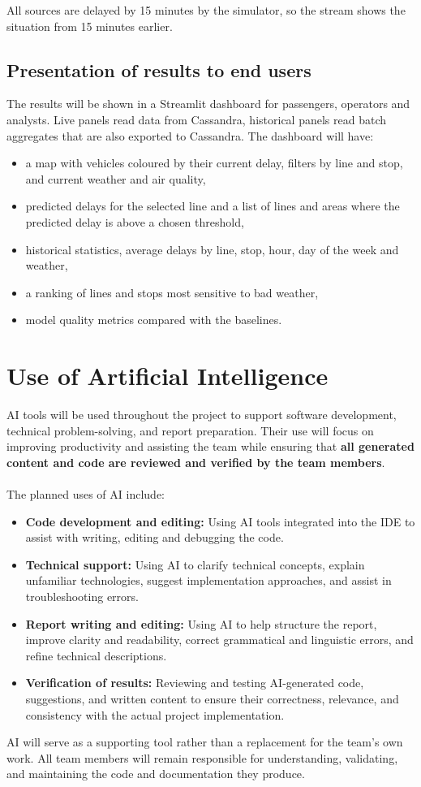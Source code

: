 \documentclass[11pt]{article}
\begin{document}
All sources are delayed by 15 minutes by the simulator, so the stream shows the situation from 15 minutes earlier.

\subsection{Presentation of results to end users}

The results will be shown in a Streamlit dashboard for passengers, operators and analysts. Live panels read data from
Cassandra, historical panels read batch aggregates that are also exported to Cassandra. The dashboard will have:
\begin{itemize}
  \item a map with vehicles coloured by their current delay, filters by line and stop, and current weather and air quality,
  \item predicted delays for the selected line and a list of lines and areas where the predicted delay is above a chosen threshold,
  \item historical statistics, average delays by line, stop, hour, day of the week and weather,
  \item a ranking of lines and stops most sensitive to bad weather,
  \item model quality metrics compared with the baselines.
\end{itemize}

\section{Use of Artificial Intelligence}

AI tools will be used throughout the project to support software development, technical problem-solving, and report preparation. Their use will focus on improving productivity and assisting the team while ensuring that \textbf{all generated content and code are reviewed and verified by the team members}. \\ \\
The planned uses of AI include:
\begin{itemize}
    \item \textbf{Code development and editing:} Using AI tools integrated into the IDE to assist with writing, editing and debugging the code.
    \item \textbf{Technical support:} Using AI to clarify technical concepts, explain unfamiliar technologies, suggest implementation approaches, and assist in troubleshooting errors.
    \item \textbf{Report writing and editing:} Using AI to help structure the report, improve clarity and readability, correct grammatical and linguistic errors, and refine technical descriptions.
    \item \textbf{Verification of results:} Reviewing and testing AI-generated code, suggestions, and written content to ensure their correctness, relevance, and consistency with the actual project implementation.
\end{itemize}
AI will serve as a supporting tool rather than a replacement for the team's own work. All team members will remain responsible for understanding, validating, and maintaining the code and documentation they produce.
\end{document}
